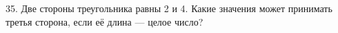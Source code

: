 35. Две стороны треугольника равны 2 и 4. Какие значения может принимать третья сторона, если её длина --- целое число?\\
